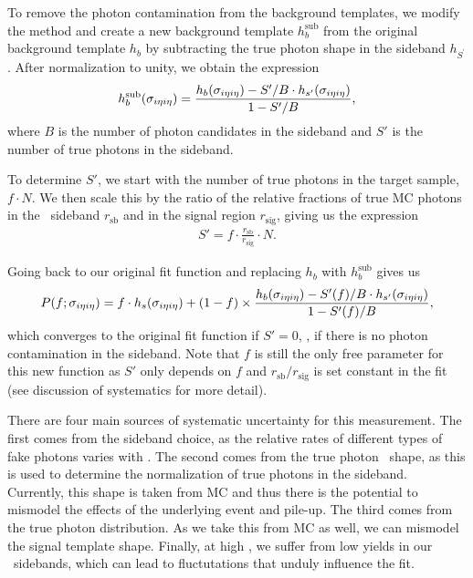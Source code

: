 To remove the photon contamination from the background templates, we modify the method and create a new background template $h_{b}^{\text{sub}}$ from the original background template $h_{b}$ by subtracting the true photon shape in the sideband $h_{S^{'}}$. 
After normalization to unity, we obtain the expression
\begin{align}
  h_{b}^{\text{sub}}(\sigma_{i\eta i\eta}) = \frac{h_{b}(\sigma_{i\eta i\eta}) - S'/B \cdot h_{s'}(\sigma_{i\eta i\eta})}{1 - S'/B},
\end{align}
where $B$ is the number of photon candidates in the sideband and $S'$ is the number of true photons in the sideband.

To determine $S'$, we start with the number of true photons in the target sample, $f \cdot N$. 
We then scale this by the ratio of the relative fractions of true MC photons in the \ICH\ sideband $r_{\text{sb}}$ and in the signal region $r_{\text{sig}}$, giving us the expression
\begin{align}
  S' = f \cdot \frac{r_{\text{sb}}}{r_{\text{sig}}} \cdot N .
\end{align}

Going back to our original fit function and replacing $h_{b}$ with $h_{b}^{\text{sub}}$ gives us
\begin{align}
  P(f;\sigma_{i\eta i\eta}) = f \cdot h_{s}(\sigma_{i\eta i\eta}) + (1 - f) \times \frac{h_{b}(\sigma_{i\eta i\eta}) - S'(f)/B \cdot h_{s'}(\sigma_{i\eta i\eta})}{1 - S'(f)/B},
\end{align}
which converges to the original fit function if $S' = 0$, \ie, if there is no photon contamination in the sideband. 
Note that $f$ is still the only free parameter for this new function as $S'$ only depends on $f$ and $r_{\text{sb}} / r_{\text{sig}}$ is set constant in the fit (see discussion of systematics for more detail).


There are four main sources of systematic uncertainty for this measurement. 
The first comes from the sideband choice, as the relative rates of different types of fake photons varies with \ICH. 
The second comes from the true photon \ICH\ shape, as this is used to determine the normalization of true photons in the sideband. 
Currently, this shape is taken from MC and thus there is the potential to mismodel the effects of the underlying event and pile-up. 
The third comes from the true photon \sieie distribution. 
As we take this from MC as well, we can mismodel the signal template shape. 
Finally, at high \pt, we suffer from low yields in our \ICH\ sidebands, which can lead to
fluctutations that unduly influence the fit.

